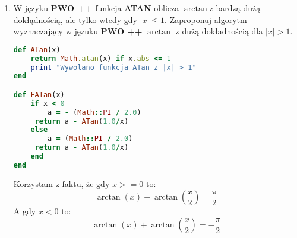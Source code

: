 \documentclass[fleqn]{article}
\begin{document}
\begin{enumerate}
\item W języku \textbf{PWO ++} funkcja \textbf{ATAN} oblicza $ \arctan$z bardzą dużą dokłądnością, ale tylko wtedy gdy $ |x| \leq 1 $. Zaproponuj algorytm wyznaczający w jęzuku  \textbf{PWO ++} $ \arctan $ z dużą dokładnością dla $ |x| > 1 $.
 \begin{lstlisting}[language=Ruby, caption= Kod w Ruby]
def ATan(x)
    return Math.atan(x) if x.abs <= 1
    print "Wywolano funkcja ATan z |x| > 1"
end

def FATan(x)
    if x < 0
        a = - (Math::PI / 2.0)
     return a - ATan(1.0/x)
    else
        a = (Math::PI / 2.0)
     return a - ATan(1.0/x)
    end
end
\end{lstlisting}
Korzystam z faktu, że gdy $ x >= 0 $ to:
\[\arctan(x) + \arctan(\frac{x}{2}) =\frac{\pi}{2}\]
A gdy $ x < 0 $ to:
\[\arctan(x) + \arctan(\frac{x}{2}) =-\frac{\pi}{2}\]
 \end{enumerate}
\end{document}
